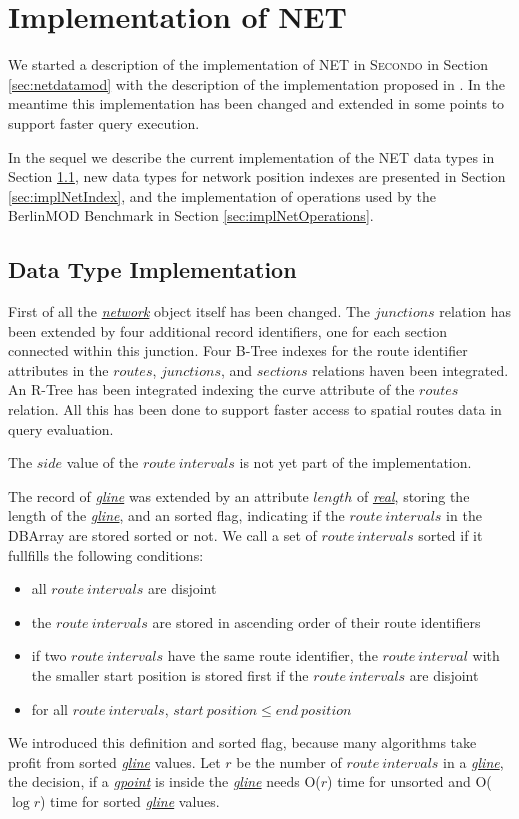 \documentclass[a4paper]{article}
\newcommand{\secondo}{\textsc{Secondo}}
\newcommand{\bmodb} {BerlinMOD Benchmark}
\newcommand{\dt}[1]{\textsl{\underline{#1}}}
\begin{document}
\section{Implementation of NET}
\label{sec:implNDM}
We started a description of the implementation of NET in \secondo{} in Section
\ref{sec:netdatamod} with the description of the implementation proposed in
\cite{NetworkGueting}. In the meantime this implementation has been changed and
extended in some points to support faster query execution.

In the sequel we describe the current implementation of the NET data types in
Section \ref{sec:implNetDataTyp}, new data types for network position indexes
are presented in Section \ref{sec:implNetIndex}, and the implementation of
operations used by the \bmodb{} in Section \ref{sec:implNetOperations}.

\subsection{Data Type Implementation}
\label{sec:implNetDataTyp}
First of all the \dt{network} object itself has been changed. The $junctions$
relation has been extended by four additional record identifiers, one for each
section connected within this junction. Four B-Tree indexes for the route
identifier attributes in the $routes$, $junctions$, and $sections$ relations
haven been integrated. An R-Tree has been integrated indexing the curve attribute
of the $routes$ relation. All this has been done to support faster access to
spatial routes data in query evaluation.

The $side$ value of the $route\ intervals$ is not yet part of the implementation.

\label{sec:sortedgline}
The record of \dt{gline} was extended by an attribute $length$ of
\dt{real}, storing the length of the \dt{gline}, and an sorted flag, indicating
if the $route\ intervals$ in the DBArray are stored sorted or not. We call a
set of $route\ intervals$ sorted if it fullfills the following conditions:
\begin{itemize}
   \item all $route\ intervals$ are disjoint
   \item the $route\ intervals$ are stored in ascending order of their route identifiers
   \item if two $route\ intervals$ have the same route identifier, the
$route\ interval$ with the smaller start position is stored first if the
$route\ intervals$ are disjoint
   \item for all $route\ intervals$, $start\ position \le end\ position$
\end{itemize}
We introduced this definition and sorted flag, because many algorithms take profit
from sorted \dt{gline} values. Let $r$ be the number of $route\ intervals$ in a
\dt{gline}, the decision, if a \dt{gpoint} is inside the \dt{gline} needs O($r$)
time for unsorted and O($\log r$) time for sorted \dt{gline} values.
\end{document}
